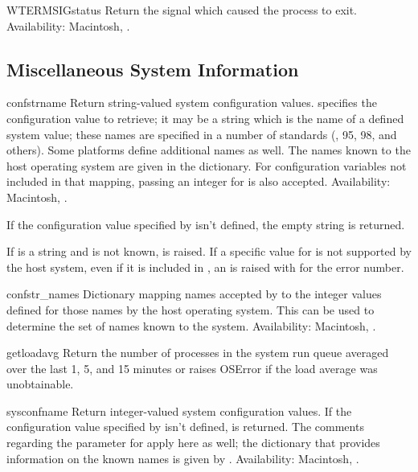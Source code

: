 \begin{funcdesc}{WTERMSIG}{status}
Return the signal which caused the process to exit.
Availability: Macintosh, \UNIX.
\end{funcdesc}


\subsection{Miscellaneous System Information \label{os-path}}


\begin{funcdesc}{confstr}{name}
Return string-valued system configuration values.
 specifies the configuration value to retrieve; it may be a
string which is the name of a defined system value; these names are
specified in a number of standards (\POSIX, \UNIX{} 95, \UNIX{} 98, and
others).  Some platforms define additional names as well.  The names
known to the host operating system are given in the
 dictionary.  For configuration variables not
included in that mapping, passing an integer for  is also
accepted.
Availability: Macintosh, \UNIX.

If the configuration value specified by  isn't defined, the
empty string is returned.

If  is a string and is not known,  is
raised.  If a specific value for  is not supported by the
host system, even if it is included in , an
 is raised with  for the
error number.
\end{funcdesc}

\begin{datadesc}{confstr_names}
Dictionary mapping names accepted by  to the
integer values defined for those names by the host operating system.
This can be used to determine the set of names known to the system.
Availability: Macintosh, \UNIX.
\end{datadesc}

\begin{funcdesc}{getloadavg}{}
Return the number of processes in the system run queue averaged over
the last 1, 5, and 15 minutes or raises OSError if the load average
was unobtainable.

\end{funcdesc}

\begin{funcdesc}{sysconf}{name}
Return integer-valued system configuration values.
If the configuration value specified by  isn't defined,
 is returned.  The comments regarding the 
parameter for  apply here as well; the dictionary
that provides information on the known names is given by
.
Availability: Macintosh, \UNIX.
\end{funcdesc}

